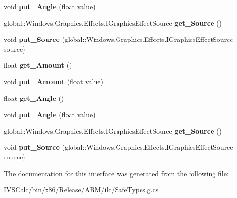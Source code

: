 \begin{DoxyCompactItemize}
void {\bfseries put\+\_\+\+Angle} (float value)
\item 
\mbox{\label{interface_microsoft_1_1_graphics_1_1_canvas_1_1_effects_1_1_i_emboss_effect_adf3fd330425fb1ca6fcf9bf2b14f108f}} 
global\+::\+Windows.\+Graphics.\+Effects.\+I\+Graphics\+Effect\+Source {\bfseries get\+\_\+\+Source} ()
\item 
\mbox{\label{interface_microsoft_1_1_graphics_1_1_canvas_1_1_effects_1_1_i_emboss_effect_a0beba0a5351e5945a4d86ac4e850ffba}} 
void {\bfseries put\+\_\+\+Source} (global\+::\+Windows.\+Graphics.\+Effects.\+I\+Graphics\+Effect\+Source source)
\item 
\mbox{\label{interface_microsoft_1_1_graphics_1_1_canvas_1_1_effects_1_1_i_emboss_effect_a1335600c5f13152a8846556dd82a3c6a}} 
float {\bfseries get\+\_\+\+Amount} ()
\item 
\mbox{\label{interface_microsoft_1_1_graphics_1_1_canvas_1_1_effects_1_1_i_emboss_effect_af365bd3a8f1fa96d24219c0d6150c0af}} 
void {\bfseries put\+\_\+\+Amount} (float value)
\item 
\mbox{\label{interface_microsoft_1_1_graphics_1_1_canvas_1_1_effects_1_1_i_emboss_effect_a40c6db54f51aa5bc19649ee456d1afd4}} 
float {\bfseries get\+\_\+\+Angle} ()
\item 
\mbox{\label{interface_microsoft_1_1_graphics_1_1_canvas_1_1_effects_1_1_i_emboss_effect_aa128a0cacc6e71db4b51016111649d41}} 
void {\bfseries put\+\_\+\+Angle} (float value)
\item 
\mbox{\label{interface_microsoft_1_1_graphics_1_1_canvas_1_1_effects_1_1_i_emboss_effect_adf3fd330425fb1ca6fcf9bf2b14f108f}} 
global\+::\+Windows.\+Graphics.\+Effects.\+I\+Graphics\+Effect\+Source {\bfseries get\+\_\+\+Source} ()
\item 
\mbox{\label{interface_microsoft_1_1_graphics_1_1_canvas_1_1_effects_1_1_i_emboss_effect_a0beba0a5351e5945a4d86ac4e850ffba}} 
void {\bfseries put\+\_\+\+Source} (global\+::\+Windows.\+Graphics.\+Effects.\+I\+Graphics\+Effect\+Source source)
\end{DoxyCompactItemize}


The documentation for this interface was generated from the following file\+:\begin{DoxyCompactItemize}
\item 
I\+V\+S\+Calc/bin/x86/\+Release/\+A\+R\+M/ilc/Safe\+Types.\+g.\+cs\end{DoxyCompactItemize}
